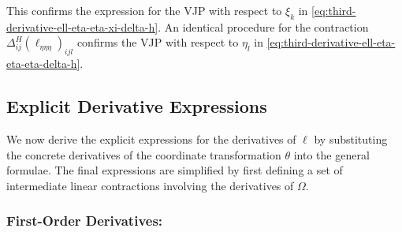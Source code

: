 \documentclass{article}
\begin{document}
%
This confirms the expression for the VJP with respect to $\xi_k$ in \cref{eq:third-derivative-ell-eta-eta-xi-delta-h}.
An identical procedure for the contraction $\Delta^H_{ij} (\ell_{\eta\eta\eta})_{ijl}$ confirms the VJP with respect to $\eta_l$ in \cref{eq:third-derivative-ell-eta-eta-eta-delta-h}.

\subsection{Explicit Derivative Expressions}

We now derive the explicit expressions for the derivatives of $\ell$ by substituting the concrete derivatives of the coordinate transformation $\theta$ into the general formulae.
The final expressions are simplified by first defining a set of intermediate linear contractions involving the derivatives of $\Omega$.

\subsubsection{First-Order Derivatives:}
\end{document}
